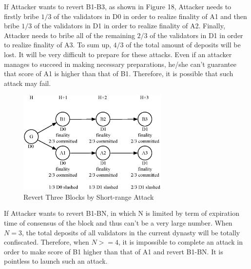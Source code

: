 If Attacker wants to revert B1-B3, as shown in Figure 18, Attacker needs to firstly bribe $1/3$ of the validators in D0 in order to realize finality of A1 and then bribe $1/3$ of the validators in D1 in order to realize finality of A2. Finally, Attacker needs to bribe all of the remaining $2/3$ of the validators in D1 in order to realize finality of A3. To sum up, $4/3$ of the total amount of deposits will be lost. It will be very difficult to prepare for these attacks. Even if an attacker manages to succeed in making necessary preparations, he/she can’t guarantee that score of A1 is higher than that of B1. Therefore, it is possible that such attack may fail.


\begin{figure}[h]
\centering
\includegraphics[width=7.5cm]{./figs/revert3}
\caption{Revert Three Blocks by Short-range Attack}
\label{fig:revert3}
\end{figure}

If Attacker wants to revert B1-BN, in which N is limited by term of expiration time of consensus of the block and thus can't be a very large number. When $N = 3$, the total deposits of all validators in the current dynasty will be totally confiscated. Therefore, when $N >= 4$, it is impossible to complete an attack in order to make score of B1 higher than that of A1 and revert B1-BN. It is pointless to launch such an attack.

